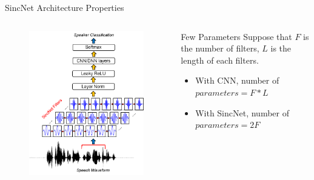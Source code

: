 \documentclass[11pt]{beamer}
\begin{document}
\begin{frame}{SincNet Architecture Properties}
	\begin{columns}
		\begin{column}{0.47\textwidth}
			\begin{figure}[H]
				\includegraphics[width=0.9\linewidth]{images/SincNet.png}
			\end{figure}
		\end{column}
		\begin{column}{0.5\textwidth}
			Few Parameters \newline
			Suppose that $F$ is the number of filters, $L$ is the length of each filters.
			\begin{itemize}
				\item With CNN, number of $parameters = F * L$
				\item With SincNet, number of $parameters = 2F$
			\end{itemize}
		\end{column}
	\end{columns}
\end{frame}
\end{document}

